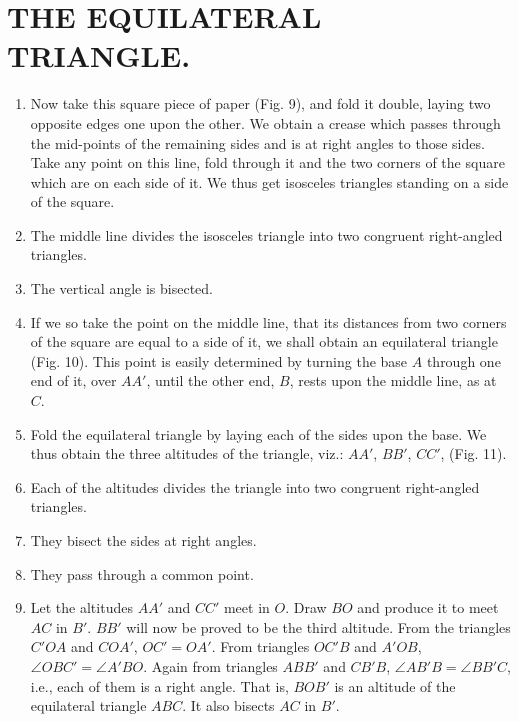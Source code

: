 
\chapter{THE EQUILATERAL TRIANGLE.}


\begin{enumerate}

    \item Now take this square piece of paper (Fig. 9), and fold it double,
        laying two opposite edges one upon the other. We obtain a crease which
        passes through the mid-points of the remaining sides and is at right
        angles to those sides.  Take any point on this line, fold through it and
        the two corners of the square which are on each side of it. We thus get
        isosceles triangles standing on a side of the square.
    

    \item The middle line divides the isosceles triangle into two congruent
        right-angled triangles.
    
    \item The vertical angle is bisected.
    
    \item If we so take the point on the middle line, that its distances from
        two corners of the square are equal to a side of it, we shall obtain an
        equilateral triangle (Fig. 10).  This point is easily determined by
        turning the base $A$ through one end of it, over $AA'$, until the other
        end, $B$, rests upon the middle line, as at $C$.
    
    \item Fold the equilateral triangle by laying each of the sides upon the
        base.  We thus obtain the three altitudes of the triangle, viz.: $AA'$,
        $BB'$, $CC'$, (Fig.  11).
    
    \item Each of the altitudes divides the triangle into two congruent
        right-angled triangles.

    \item They bisect the sides at right angles.

    \item They pass through a common point.

    \item Let the altitudes $AA'$ and $CC'$ meet in $O$.  Draw $BO$ and produce
        it to meet $AC$ in $B'$.  $BB'$ will now be proved to be the third
        altitude.  From the triangles $C'OA$ and $COA'$, $OC'=OA'$.  From
        triangles $OC'B$ and $A'OB$, $\angle OBC'= \angle A'BO$.  Again from
        triangles $ABB'$ and $CB'B$, $\angle AB'B = \angle BB'C$, i.e., each of
        them is a right angle.  That is, $BOB'$ is an altitude of the
        equilateral triangle $ABC$.  It also bisects $AC$ in $B'$.


\end{enumerate}
